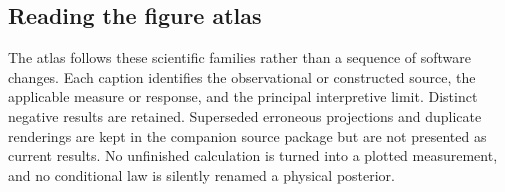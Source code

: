 \subsection{Reading the figure atlas}

The atlas follows these scientific families rather than a sequence of software changes. Each caption identifies the observational or constructed source, the applicable measure or response, and the principal interpretive limit. Distinct negative results are retained. Superseded erroneous projections and duplicate renderings are kept in the companion source package but are not presented as current results. No unfinished calculation is turned into a plotted measurement, and no conditional law is silently renamed a physical posterior.
